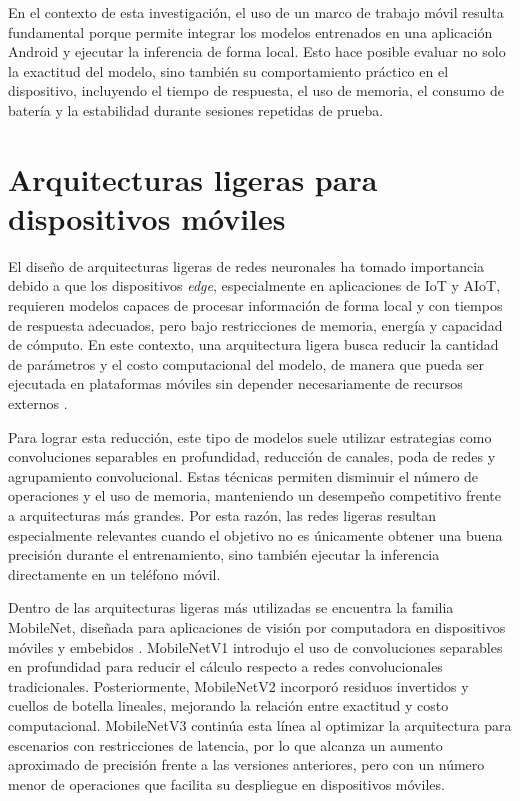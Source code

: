 En el contexto de esta investigación, el uso de un marco de trabajo móvil resulta fundamental porque permite integrar los modelos
entrenados en una aplicación Android y ejecutar la inferencia de forma local. Esto hace posible evaluar no solo la exactitud del modelo,
sino también su comportamiento práctico en el dispositivo, incluyendo el tiempo de respuesta, el uso de memoria, el consumo de batería y
la estabilidad durante sesiones repetidas de prueba.



\section{Arquitecturas ligeras para dispositivos móviles}

El diseño de arquitecturas ligeras de redes neuronales ha tomado importancia debido a que los dispositivos \textit{edge}, especialmente
en aplicaciones de IoT y AIoT, requieren modelos capaces de procesar información de forma local y con tiempos de respuesta adecuados,
pero bajo restricciones de memoria, energía y capacidad de cómputo. En este contexto, una arquitectura ligera busca reducir la cantidad
de parámetros y el costo computacional del modelo, de manera que pueda ser ejecutada en plataformas móviles sin depender necesariamente
de recursos externos \cite{wang2025empowering}.

Para lograr esta reducción, este tipo de modelos suele utilizar estrategias como convoluciones separables en profundidad, reducción de
canales, poda de redes y agrupamiento convolucional. Estas técnicas permiten disminuir el número de operaciones y el uso de memoria,
manteniendo un desempeño competitivo frente a arquitecturas más grandes. Por esta razón, las redes ligeras resultan especialmente
relevantes cuando el objetivo no es únicamente obtener una buena precisión durante el entrenamiento, sino también ejecutar la inferencia
directamente en un teléfono móvil.

Dentro de las arquitecturas ligeras más utilizadas se encuentra la familia MobileNet, diseñada para aplicaciones de visión por computadora
en dispositivos móviles y embebidos \cite{howard2017mobilenetsefficientconvolutionalneural}. MobileNetV1 introdujo el uso de convoluciones
separables en profundidad para reducir el cálculo respecto a redes convolucionales tradicionales. Posteriormente, MobileNetV2 incorporó
residuos invertidos y cuellos de botella lineales, mejorando la relación entre exactitud y costo computacional. MobileNetV3 continúa esta
línea al optimizar la arquitectura para escenarios con restricciones de latencia, por lo que alcanza un aumento aproximado de precisión
frente a las versiones anteriores, pero con un número menor de operaciones que facilita su despliegue en dispositivos móviles.

